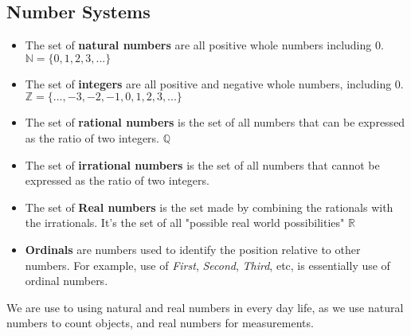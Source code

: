 \subsection{Number Systems}
  \begin{itemize}
    \setlength{\itemsep}{0em}
    \item {}The set of \textbf{natural numbers} are all positive whole numbers including 0.
      \subitem $ \mathbb{N}=\{0,1,2,3,...\} $
    \item {}The set of \textbf{integers} are all positive and negative whole numbers, including 0.
      \subitem $ \mathbb{Z}=\{...,-3,-2,-1,0,1,2,3,...\} $
    \item {}The set of \textbf{rational numbers} is the set of all numbers that can be expressed as the ratio of two integers.
      \subitem $ \mathbb{Q} $
    \item {}The set of \textbf{irrational numbers} is the set of all numbers that cannot be expressed as the ratio of two integers.
    \item {}The set of \textbf{Real numbers} is the set made by combining the rationals with the irrationals. It's the set of all "possible real world possibilities"
      \subitem $ \mathbb{R} $
    \item {}\textbf{Ordinals} are numbers used to identify the position relative to other numbers. For example, use of \textit{First}, \textit{Second}, \textit{Third}, etc, is essentially use of ordinal numbers.
  \end{itemize}
  We are use to using natural and real numbers in every day life, as we use natural numbers to count objects, and real numbers for measurements.
